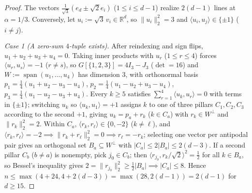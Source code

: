 \documentclass[11pt,reqno]{amsart}
\theoremstyle{definition}
\theoremstyle{remark}
\numberwithin{equation}{section}
\numberwithin{table}{section}
\DeclareMathOperator{\spn}{span}
\begin{document}
\begin{proof}
The vectors $\frac{1}{\sqrt{3}}(e_d \pm \sqrt{2} e_i)$ ($1 \le i \le d - 1$) realize $2(d - 1)$ lines at $\alpha = 1/3$. Conversely, let $u_i := \sqrt{3}\,v_i \in \mathbb{R}^d$, so $\|u_i\|_2^2 = 3$ and $\langle u_i, u_j \rangle \in \{\pm 1\}$ ($i \neq j$).

\emph{Case 1 (A zero-sum $4$-tuple exists).} After reindexing and sign flips, $u_1 + u_2 + u_3 + u_4 = 0$. Taking inner products with $u_r$ ($1 \le r \le 4$) forces $\langle u_r, u_s \rangle = -1$ ($r \neq s$), so $G[\{1,2,3\}] = 4I_3 - J_3$ ($\det = 16$) and $W := \spn(u_1, \dots, u_4)$ has dimension $3$, with orthonormal basis $p_1 = \frac{1}{4}(u_1+u_2-u_3-u_4)$, $p_2 = \frac{1}{4}(u_1-u_2+u_3-u_4)$, $p_3 = \frac{1}{4}(u_1-u_2-u_3+u_4)$. Every $k \ge 5$ satisfies $\sum_{r=1}^4 \langle u_k, u_r \rangle = 0$ with terms in $\{\pm 1\}$; switching $u_k$ so $\langle u_k, u_1 \rangle = +1$ assigns $k$ to one of three pillars $C_1, C_2, C_3$ according to the second $+1$, giving $u_k = p_a + r_k$ ($k \in C_a$) with $r_k \in W^\perp$ and $\|r_k\|_2^2 = 2$. Within $C_a$, $\langle r_k, r_\ell \rangle \in \{0, -2\}$ ($k \neq \ell$), and $\langle r_k, r_\ell \rangle = -2 \implies \|r_k + r_\ell\|_2^2 = 0 \implies r_\ell = -r_k$; selecting one vector per antipodal pair gives an orthogonal set $B_a \subseteq W^\perp$ with $|C_a| \le 2|B_a| \le 2(d - 3)$. If a second pillar $C_b$ ($b \neq a$) is nonempty, pick $j_0 \in C_b$; then $\langle r_{j_0}, r_k/\sqrt{2} \rangle^2 = \frac{1}{2}$ for all $k \in B_a$, so Bessel's inequality gives $2 = \|r_{j_0}\|_2^2 \ge \frac{1}{2}|B_a| \implies |C_a| \le 8$. Hence $n \le \max(4 + 24, 4 + 2(d - 3)) = \max(28, 2(d - 1)) = 2(d - 1)$ for $d \ge 15$.


\end{proof}
\end{document}
